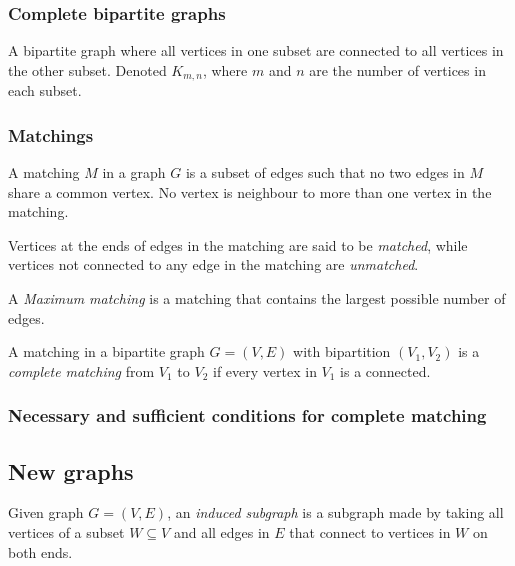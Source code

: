 \subsubsection{Complete bipartite graphs}
A bipartite graph where all vertices in one subset are connected to all vertices in the other subset. Denoted $K_{m,n}$, where $m$ and $n$ are the number of vertices in each subset.

\subsubsection{Matchings}
A matching $M$ in a graph $G$ is a subset of edges such that no two edges in $M$ share a common vertex. 
No vertex is neighbour to more than one vertex in the matching.

Vertices at the ends of edges in the matching are said to be \emph{matched}, while vertices not connected to any edge in the matching are \emph{unmatched}.

A \emph{Maximum matching} is a matching that contains the largest possible number of edges.

A matching in a bipartite graph $G=(V,E)$ with bipartition $(V_1,V_2)$ is a \emph{complete matching} from $V_1$ to $V_2$ if every vertex in $V_1$ is a connected.


\subsubsection{Necessary and sufficient conditions for complete matching}

\subsection{New graphs}

Given graph $G=(V,E)$, an \emph{induced subgraph} is a subgraph made by taking all vertices of a subset $W \subseteq V$ and all edges in $E$ that connect to vertices in $W$ on both ends.

